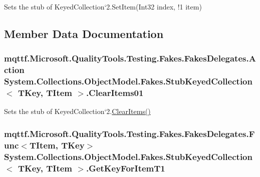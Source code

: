 Sets the stub of Keyed\-Collection`2.Set\-Item(Int32 index, !1 item)



\subsection{Member Data Documentation}
\hypertarget{class_system_1_1_collections_1_1_object_model_1_1_fakes_1_1_stub_keyed_collection_3_01_t_key_00_01_t_item_01_4_aff860554292897ff423accde8d3b0727}{
\subsubsection[{Clear\-Items01}]{\setlength{\rightskip}{0pt plus 5cm}mqttf.\-Microsoft.\-Quality\-Tools.\-Testing.\-Fakes.\-Fakes\-Delegates.\-Action System.\-Collections.\-Object\-Model.\-Fakes.\-Stub\-Keyed\-Collection$<$ T\-Key, T\-Item $>$.Clear\-Items01}}\label{class_system_1_1_collections_1_1_object_model_1_1_fakes_1_1_stub_keyed_collection_3_01_t_key_00_01_t_item_01_4_aff860554292897ff423accde8d3b0727}


Sets the stub of Keyed\-Collection`2.\hyperlink{class_system_1_1_collections_1_1_object_model_1_1_fakes_1_1_stub_keyed_collection_3_01_t_key_00_01_t_item_01_4_a72c488aa9e4423358251d529a0650f77}{Clear\-Items()}

\hypertarget{class_system_1_1_collections_1_1_object_model_1_1_fakes_1_1_stub_keyed_collection_3_01_t_key_00_01_t_item_01_4_a9dd8fda8dfa7fc0a1a2f62d11f8680e7}{
\subsubsection[{Get\-Key\-For\-Item\-T1}]{\setlength{\rightskip}{0pt plus 5cm}mqttf.\-Microsoft.\-Quality\-Tools.\-Testing.\-Fakes.\-Fakes\-Delegates.\-Func$<$T\-Item, T\-Key$>$ System.\-Collections.\-Object\-Model.\-Fakes.\-Stub\-Keyed\-Collection$<$ T\-Key, T\-Item $>$.Get\-Key\-For\-Item\-T1}}\label{class_system_1_1_collections_1_1_object_model_1_1_fakes_1_1_stub_keyed_collection_3_01_t_key_00_01_t_item_01_4_a9dd8fda8dfa7fc0a1a2f62d11f8680e7}


